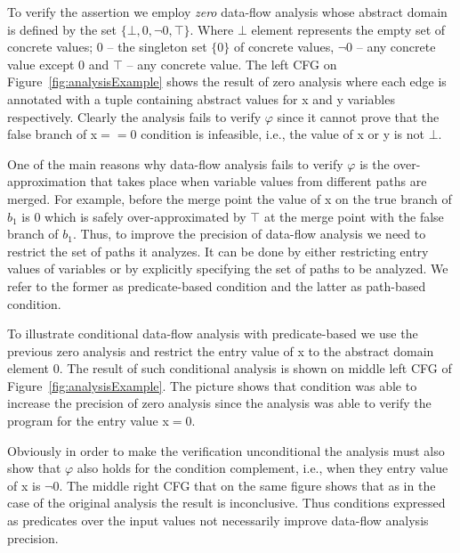 To verify the assertion we employ {\em zero} data-flow analysis whose abstract domain is defined by the set $\{\bot, 0, \neg 0, \top\}$. Where $\bot$ element represents the empty set of concrete values; $0$ -- the singleton set $\{0\}$ of concrete values, $\neg 0$ -- any concrete value except $0$ and $\top$ -- any concrete value. The left CFG on Figure~\ref{fig:analysisExample} shows the result of zero analysis where each edge is annotated with a tuple containing abstract values for x and y variables respectively. Clearly the analysis fails to verify $\varphi$ since it cannot prove that the false branch of x$==$0 condition is infeasible, i.e., the value of x or y is not $\bot$.

One of the main reasons why data-flow analysis fails to verify $\varphi$ is the over-approximation that takes place when variable values from different paths are merged. For example, before the merge point the value of x on the true branch of $b_1$ is $0$ which is safely over-approximated by $\top$ at the merge point with the false branch of $b_1$. Thus, to improve the precision of data-flow analysis we need to restrict the set of paths it analyzes. It can be done by either restricting entry values of variables or by explicitly specifying the set of paths to be analyzed. We refer to the former as predicate-based condition and the latter as path-based condition.


To illustrate conditional data-flow analysis with predicate-based we use the previous zero analysis and restrict the entry value of x  to the abstract domain element $0$. The result of such conditional analysis is shown on middle left CFG of Figure~\ref{fig:analysisExample}. The picture shows that condition was able to increase the precision of zero analysis since the analysis was able to verify the program for the entry value x$=0$.

Obviously in order to make the verification unconditional the analysis must also show that $\varphi$ also holds for the condition complement, i.e., when they entry value of x is $\neg 0$. The middle right CFG that on the same figure shows that as in the case of the original analysis the result is inconclusive. Thus conditions expressed as predicates over the input values not necessarily improve data-flow analysis precision.

